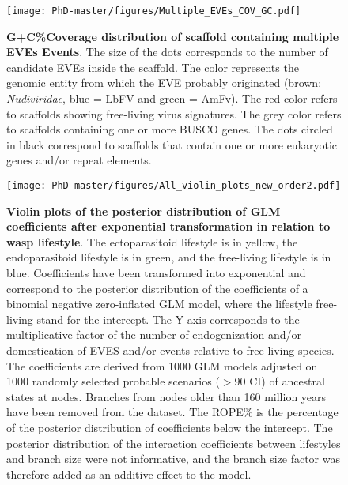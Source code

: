 \begin{figure}[!htpb]
\captionsetup{font=footnotesize}
 \centering
    \texttt{[image: PhD-master/figures/Multiple\_EVEs\_COV\_GC.pdf]}
\caption[Paper1:GC and coverage distribution of scaffolds containing multiple EVEs Events]{\textbf{G+C\%Coverage distribution of scaffold containing multiple EVEs Events}.  The size of the dots corresponds to the number of candidate EVEs inside the scaffold. The color represents the genomic entity from which the EVE probably originated (brown: \textit{Nudiviridae}, blue = LbFV and green = AmFv). The red color refers to scaffolds showing free-living virus signatures. The grey color refers to scaffolds containing one or more BUSCO genes. The dots circled in black correspond to scaffolds that contain one or more eukaryotic genes and/or repeat elements.}
\label{figure:Multiple_EVEs_COV_GC}
\end{figure}


\begin{figure}[!htbp]
\captionsetup{font=footnotesize}
 \centering
  \texttt{[image: PhD-master/figures/All\_violin\_plots\_new\_order2.pdf]}
\caption[Paper1:Violon plot distribution of GLM coefficients of EVEs,dEVEs,Events and dEvents for each genomic viral structure]{\textbf{Violin plots of the posterior distribution of GLM coefficients after exponential transformation in relation to wasp lifestyle}. The ectoparasitoid lifestyle is in yellow, the endoparasitoid lifestyle is in green, and the free-living lifestyle is in blue. Coefficients have been transformed into exponential and correspond to the posterior distribution of the coefficients of a binomial negative zero-inflated GLM model, where the lifestyle free-living stand for the intercept. The Y-axis corresponds to the multiplicative factor of the number of endogenization and/or domestication of EVES and/or events relative to free-living species. The coefficients are derived from 1000 GLM models adjusted on 1000 randomly selected probable scenarios ($>$90 CI) of ancestral states at nodes. Branches from nodes older than 160 million years have been removed from the dataset. The ROPE\% is the percentage of the posterior distribution of coefficients below the intercept. The posterior distribution of the interaction coefficients between lifestyles and branch size were not informative, and the branch size factor was therefore added as an additive effect to the model.}
\label{figure:All_violin_plots}
\end{figure}


